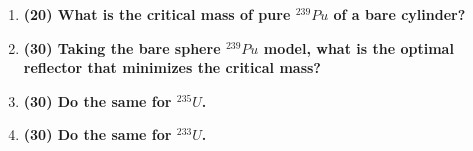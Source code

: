 \documentclass[11pt,a4paper]{article}
\begin{document}
\begin{enumerate}[leftmargin=*,topsep=0pt,font=\bfseries]
        \newpage 
    \item\textbf{(20) What is the critical mass of pure $^{239}Pu$ of a bare cylinder?}
        \vspace{0.25in}\\























        \newpage 
    \item\textbf{(30) Taking the bare sphere $^{239}Pu$ model, what is the optimal reflector that minimizes the critical mass?}
        \vspace{0.25in}\\



























        \newpage 
    \item\textbf{(30) Do the same for $^{235}U$.}
        \vspace{0.25in}\\





















        \newpage 
    \item\textbf{(30) Do the same for $^{233}U$.}
        \vspace{0.25in}\\































\end{enumerate}
\end{document}
